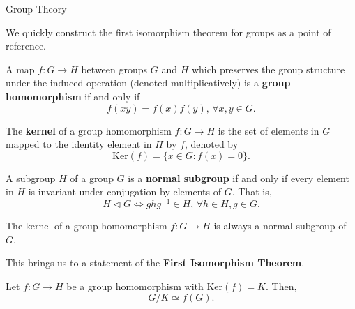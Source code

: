 \begin{section}{Group Theory}

We quickly construct the first isomorphism theorem for groups as a point of reference.

\begin{defn}
  A map $f \colon G \to H$ between groups $G$ and $H$ which preserves the group structure under the induced operation (denoted multiplicatively) is a {\bf group homomorphism} if and only if 
  $$f(xy) = f(x)f(y), \, \forall x,y \in G.$$
\end{defn}

\begin{defn}
  The {\bf kernel} of a group homomorphism $f \colon G \to H$ is the set of elements in $G$ mapped to the identity element in $H$ by $f$, denoted by
  $$\text{Ker}(f) = \{x \in G \colon f(x) = 0 \}.$$
\end{defn}

\begin{defn}
  A subgroup $H$ of a group $G$ is a {\bf normal subgroup} if and only if every element in $H$ is invariant under conjugation by elements of $G$. That is,
  $$H \triangleleft G \iff ghg^{-1} \in H, \, \forall h \in H, g \in G.$$
\end{defn}

\begin{prop}
  The kernel of a group homomorphism $f \colon G \to H$ is always a normal subgroup of $G$.
\end{prop}

This brings us to a statement of the {\bf First Isomorphism Theorem}.

\begin{thm}
  Let $f \colon G \to H$ be a group homomorphism with $\text{Ker}(f) = K$. Then,
  $$G/K \simeq f(G).$$
\end{thm}

\end{section}
